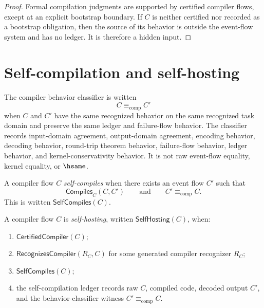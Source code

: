 \begin{proof}
Formal compilation judgments are supported by certified compiler flows, except at an explicit bootstrap boundary. If $C$ is neither certified nor recorded as a bootstrap obligation, then the source of its behavior is outside the event-flow system and has no ledger. It is therefore a hidden input.
\end{proof}

\section{Self-compilation and self-hosting}
\label{sec:self-hosting-compiler-self-compilation}

\begin{definition}
\label{def:self-hosting-compiler-behavior-classifier}
The compiler behavior classifier is written
$$
  C\equiv_{\mathrm{comp}} C'
$$
when $C$ and $C'$ have the same recognized behavior on the same recognized task domain and preserve the same ledger and failure-flow behavior. The classifier records input-domain agreement, output-domain agreement, encoding behavior, decoding behavior, round-trip theorem behavior, failure-flow behavior, ledger behavior, and kernel-conservativity behavior. It is not raw event-flow equality, kernel equality, or $\hsame$.
\end{definition}

\begin{definition}
\label{def:self-hosting-compiler-self-compilation}
A compiler flow $C$ \emph{self-compiles} when there exists an event flow $C'$ such that
$$
  \mathsf{Compiles}_C(C,C')
  \qquad\text{and}\qquad
  C'\equiv_{\mathrm{comp}}C.
$$
This is written $\mathsf{SelfCompiles}(C)$.
\end{definition}

\begin{definition}
\label{def:self-hosting-compiler-flow}
A compiler flow $C$ is \emph{self-hosting}, written $\mathsf{SelfHosting}(C)$, when:
\begin{enumerate}
\item $\mathsf{CertifiedCompiler}(C)$;
\item $\mathsf{RecognizesCompiler}(R_C,C)$ for some generated compiler recognizer $R_C$;
\item $\mathsf{SelfCompiles}(C)$;
\item the self-compilation ledger records raw $C$, compiled code, decoded output $C'$, and the behavior-classifier witness $C'\equiv_{\mathrm{comp}}C$.
\end{enumerate}
\end{definition}

